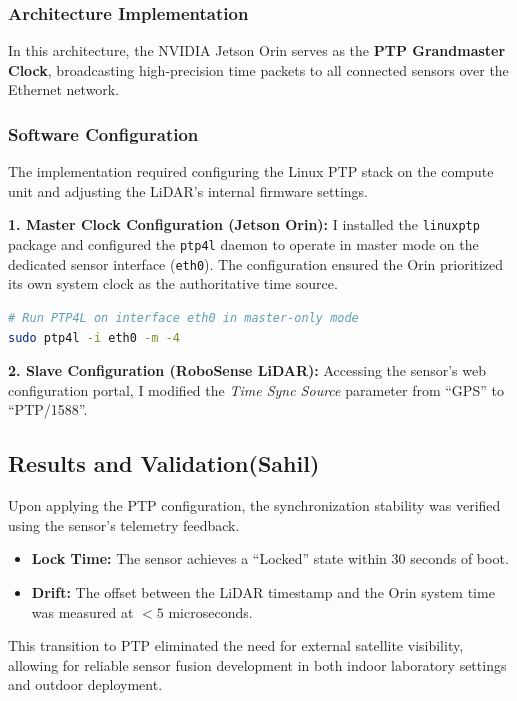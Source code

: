 \documentclass[12pt,a4paper]{report}
\begin{document}
\subsubsection{Architecture Implementation}
In this architecture, the NVIDIA Jetson Orin serves as the \textbf{PTP Grandmaster Clock}, broadcasting high-precision time packets to all connected sensors over the Ethernet network.

\subsubsection{Software Configuration}
The implementation required configuring the Linux PTP stack on the compute unit and adjusting the LiDAR's internal firmware settings.

\textbf{1. Master Clock Configuration (Jetson Orin):}
I installed the \texttt{linuxptp} package and configured the \texttt{ptp4l} daemon to operate in master mode on the dedicated sensor interface (\texttt{eth0}). The configuration ensured the Orin prioritized its own system clock as the authoritative time source.

\begin{lstlisting}[language=bash, caption={Launching PTP4L in Master Mode}]
# Run PTP4L on interface eth0 in master-only mode
sudo ptp4l -i eth0 -m -4
\end{lstlisting}

\textbf{2. Slave Configuration (RoboSense LiDAR):}
Accessing the sensor's web configuration portal, I modified the \textit{Time Sync Source} parameter from ``GPS'' to ``PTP/1588''.

\subsection{Results and Validation(Sahil)}
Upon applying the PTP configuration, the synchronization stability was verified using the sensor's telemetry feedback.
\begin{itemize}
    \item \textbf{Lock Time:} The sensor achieves a ``Locked'' state within 30 seconds of boot.
    \item \textbf{Drift:} The offset between the LiDAR timestamp and the Orin system time was measured at $< 5$ microseconds.
\end{itemize}

This transition to PTP eliminated the need for external satellite visibility, allowing for reliable sensor fusion development in both indoor laboratory settings and outdoor deployment.
\end{document}
